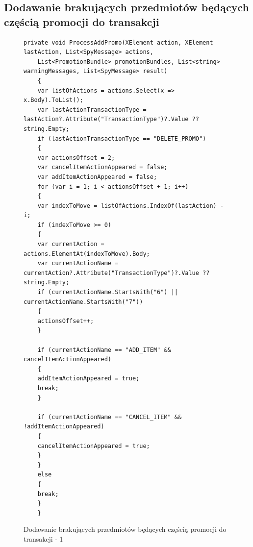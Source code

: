 \documentclass[a4paper]{book}
\begin{document}
\subsection{Dodawanie brakujących przedmiotów będących częścią promocji do transakcji}
\begin{figure}[h]
	\begin{lstlisting}[frame=single, breaklines=true]
	private void ProcessAddPromo(XElement action, XElement lastAction, List<SpyMessage> actions,
	List<PromotionBundle> promotionBundles, List<string> warningMessages, List<SpyMessage> result)
	{
	var listOfActions = actions.Select(x => x.Body).ToList();
	var lastActionTransactionType = lastAction?.Attribute("TransactionType")?.Value ?? string.Empty;
	if (lastActionTransactionType == "DELETE_PROMO")
	{
	var actionsOffset = 2;
	var cancelItemActionAppeared = false;
	var addItemActionAppeared = false;
	for (var i = 1; i < actionsOffset + 1; i++)
	{
	var indexToMove = listOfActions.IndexOf(lastAction) - i;
	if (indexToMove >= 0)
	{
	var currentAction = actions.ElementAt(indexToMove).Body;
	var currentActionName = currentAction?.Attribute("TransactionType")?.Value ?? string.Empty;
	if (currentActionName.StartsWith("6") || currentActionName.StartsWith("7"))
	{
	actionsOffset++;
	}
	
	if (currentActionName == "ADD_ITEM" && cancelItemActionAppeared)
	{
	addItemActionAppeared = true;
	break;
	}
	
	if (currentActionName == "CANCEL_ITEM" && !addItemActionAppeared)
	{
	cancelItemActionAppeared = true;
	}
	}
	else
	{
	break;
	}
	}
	\end{lstlisting}
	\caption{Dodawanie brakujących przedmiotów będących częścią promocji do transakcji - 1}
	\label{lst:brakujaceProdukty1}
\end{figure}
\end{document}
